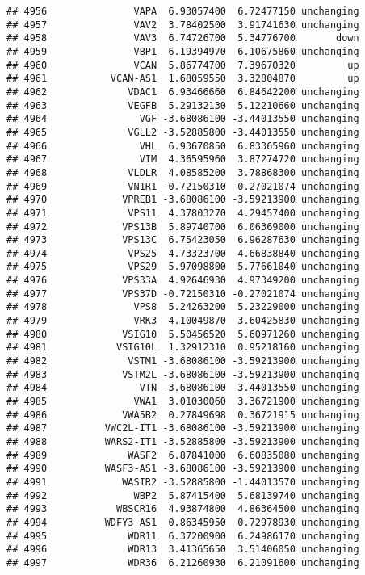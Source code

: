 \documentclass[]{article}
\begin{document}
\begin{verbatim}
## 4956               VAPA  6.93057400  6.72477150 unchanging
## 4957               VAV2  3.78402500  3.91741630 unchanging
## 4958               VAV3  6.74726700  5.34776700       down
## 4959               VBP1  6.19394970  6.10675860 unchanging
## 4960               VCAN  5.86774700  7.39670320         up
## 4961           VCAN-AS1  1.68059550  3.32804870         up
## 4962              VDAC1  6.93466660  6.84642200 unchanging
## 4963              VEGFB  5.29132130  5.12210660 unchanging
## 4964                VGF -3.68086100 -3.44013550 unchanging
## 4965              VGLL2 -3.52885800 -3.44013550 unchanging
## 4966                VHL  6.93670850  6.83365960 unchanging
## 4967                VIM  4.36595960  3.87274720 unchanging
## 4968              VLDLR  4.08585200  3.78868300 unchanging
## 4969              VN1R1 -0.72150310 -0.27021074 unchanging
## 4970             VPREB1 -3.68086100 -3.59213900 unchanging
## 4971              VPS11  4.37803270  4.29457400 unchanging
## 4972             VPS13B  5.89740700  6.06369000 unchanging
## 4973             VPS13C  6.75423050  6.96287630 unchanging
## 4974              VPS25  4.73323700  4.66838840 unchanging
## 4975              VPS29  5.97098800  5.77661040 unchanging
## 4976             VPS33A  4.92646930  4.97349200 unchanging
## 4977             VPS37D -0.72150310 -0.27021074 unchanging
## 4978               VPS8  5.24263200  5.23229000 unchanging
## 4979               VRK3  4.10049870  3.60425830 unchanging
## 4980             VSIG10  5.50456520  5.60971260 unchanging
## 4981            VSIG10L  1.32912310  0.95218160 unchanging
## 4982              VSTM1 -3.68086100 -3.59213900 unchanging
## 4983             VSTM2L -3.68086100 -3.59213900 unchanging
## 4984                VTN -3.68086100 -3.44013550 unchanging
## 4985               VWA1  3.01030060  3.36721900 unchanging
## 4986             VWA5B2  0.27849698  0.36721915 unchanging
## 4987          VWC2L-IT1 -3.68086100 -3.59213900 unchanging
## 4988          WARS2-IT1 -3.52885800 -3.59213900 unchanging
## 4989              WASF2  6.87841000  6.60835080 unchanging
## 4990          WASF3-AS1 -3.68086100 -3.59213900 unchanging
## 4991             WASIR2 -3.52885800 -1.44013570 unchanging
## 4992               WBP2  5.87415400  5.68139740 unchanging
## 4993            WBSCR16  4.93874800  4.86364500 unchanging
## 4994          WDFY3-AS1  0.86345950  0.72978930 unchanging
## 4995              WDR11  6.37200900  6.24986170 unchanging
## 4996              WDR13  3.41365650  3.51406050 unchanging
## 4997              WDR36  6.21260930  6.21091600 unchanging

\end{verbatim}
\end{document}
